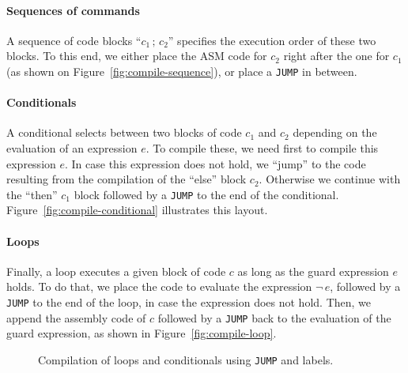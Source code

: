 \documentclass {aldast}
\begin{document}
\paragraph{Sequences of commands}
 A sequence of code blocks ``$c_1 \, ;\, c_2$'' specifies the
execution order of these two blocks. To this end, we either place the
ASM code for $c_2$ right after the one for $c_1$ (as shown on
Figure~\ref{fig:compile-sequence}), or place a \texttt{JUMP} in
between.


\paragraph{Conditionals} A conditional selects between two blocks of
code $c_1$ and $c_2$ depending on the evaluation of an expression
$e$. To compile these, we need first to compile this expression
$e$. In case this expression does not hold, we ``jump''
to the code resulting from the compilation of the ``else'' block
$c_2$. Otherwise we continue with the ``then'' $c_1$ block
followed by a \texttt{JUMP} to the end of the
conditional. Figure~\ref{fig:compile-conditional} illustrates this
layout.

\paragraph{Loops} Finally, a loop executes a given block of code $c$
as long as the guard expression $e$ holds. To do that, we place the
code to evaluate the expression $\neg \, e$, followed by a
\texttt{JUMP} to the end of the loop, in case the expression does not
hold. Then, we append the assembly code of $c$ followed by a
\texttt{JUMP} back to the evaluation of the guard expression, as shown
in Figure~\ref{fig:compile-loop}.


\begin{figure}
    \centering
    \hfill
    \caption{Compilation of loops and conditionals using \texttt{JUMP} and labels.}
    \label{fig:compile-control}
\end{figure}
\end{document}
